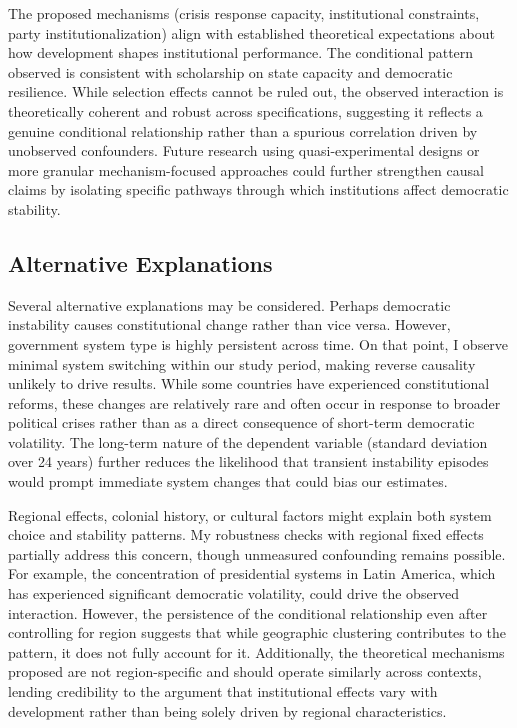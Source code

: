 \documentclass[
  letterpaper,
  DIV=11,
  numbers=noendperiod]{scrartcl}
\begin{document}
The proposed mechanisms (crisis response capacity, institutional
constraints, party institutionalization) align with established
theoretical expectations about how development shapes institutional
performance. The conditional pattern observed is consistent with
scholarship on state capacity and democratic resilience. While selection
effects cannot be ruled out, the observed interaction is theoretically
coherent and robust across specifications, suggesting it reflects a
genuine conditional relationship rather than a spurious correlation
driven by unobserved confounders. Future research using
quasi-experimental designs or more granular mechanism-focused approaches
could further strengthen causal claims by isolating specific pathways
through which institutions affect democratic stability.

\subsection{Alternative Explanations}\label{alternative-explanations}

Several alternative explanations may be considered. Perhaps democratic
instability causes constitutional change rather than vice versa.
However, government system type is highly persistent across time. On
that point, I observe minimal system switching within our study period,
making reverse causality unlikely to drive results. While some countries
have experienced constitutional reforms, these changes are relatively
rare and often occur in response to broader political crises rather than
as a direct consequence of short-term democratic volatility. The
long-term nature of the dependent variable (standard deviation over 24
years) further reduces the likelihood that transient instability
episodes would prompt immediate system changes that could bias our
estimates.

Regional effects, colonial history, or cultural factors might explain
both system choice and stability patterns. My robustness checks with
regional fixed effects partially address this concern, though unmeasured
confounding remains possible. For example, the concentration of
presidential systems in Latin America, which has experienced significant
democratic volatility, could drive the observed interaction. However,
the persistence of the conditional relationship even after controlling
for region suggests that while geographic clustering contributes to the
pattern, it does not fully account for it. Additionally, the theoretical
mechanisms proposed are not region-specific and should operate similarly
across contexts, lending credibility to the argument that institutional
effects vary with development rather than being solely driven by
regional characteristics.
\end{document}
